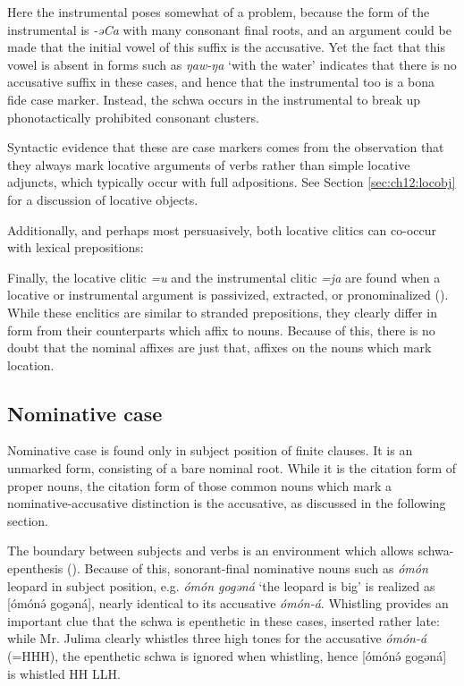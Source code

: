 Here the instrumental poses somewhat of a problem, because the form of the instrumental is \textit{-əCa} with many consonant final roots, and an argument could be made that the initial vowel of this suffix is the accusative. Yet the fact that this vowel is absent in forms such as \textit{ŋaw-ŋa} `with the water' indicates that there is no accusative suffix in these cases, and hence that the instrumental too is a bona fide case marker. Instead, the schwa occurs in the instrumental to break up phonotactically prohibited consonant clusters.
 
Syntactic evidence that these are case markers comes from the observation that they always mark locative arguments of verbs rather than simple locative adjuncts, which typically occur with full adpositions. See Section \ref{sec:ch12:locobj} for a discussion of locative objects.

Additionally, and perhaps most persuasively, both locative clitics can co-occur with lexical prepositions:



Finally, the locative clitic \textit{=u} and the instrumental clitic \textit{=ja} are found when a locative or instrumental argument is passivized, extracted, or pronominalized (). While these enclitics are similar to stranded prepositions, they clearly differ in form from their counterparts which affix to nouns. Because of this, there is no doubt that the nominal affixes are just that, affixes on the nouns which mark location.


\subsection{Nominative case}\label{section:nominative}

Nominative case is found only in subject position of finite clauses. It is an unmarked form, consisting of a bare nominal root. While it is the citation form of proper nouns, the citation form of those common nouns which mark a nominative-accusative distinction is the accusative, as discussed in the following section. 

The boundary between subjects and verbs is an environment which allows schwa-epenthesis (). Because of this, sonorant-final nominative nouns such as \textit{ómón} leopard in subject position, e.g. \textit{ómón gogəná} `the leopard is big' is realized as [ómónə́ gogəná], nearly identical to its accusative \textit{ómón-á}. Whistling provides an important clue that the schwa is epenthetic in these cases, inserted rather late: while Mr. Julima clearly whistles three high tones for the accusative \textit{ómón-á} (=HHH), the epenthetic schwa is ignored when whistling, hence [ómónə́  gogəná] is whistled HH LLH. 

